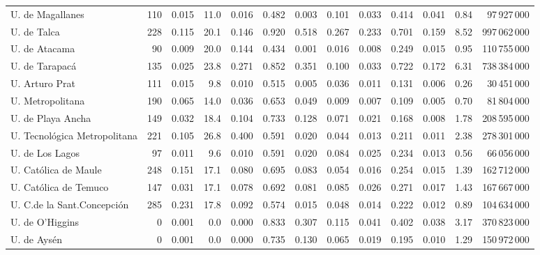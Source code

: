 \documentclass[twocolumn]{article}
\begin{document}
\begin{table}
\begin{tabular}{l rrrrrrrrrr rr}
U. de Magallanes           & 110 & 0.015 & 11.0 & 0.016 & 0.482 & 0.003 & 0.101 & 0.033 & 0.414 & 0.041 &  0.84 &     97\,927\,000\\
U. de Talca	               & 228 & 0.115 & 20.1 & 0.146 & 0.920 & 0.518 & 0.267 & 0.233 & 0.701 & 0.159 &  8.52 &    997\,062\,000\\
U. de Atacama              &  90 & 0.009 & 20.0 & 0.144 & 0.434 & 0.001 & 0.016 & 0.008 & 0.249 & 0.015 &  0.95 &    110\,755\,000\\
U. de Tarapacá             & 135 & 0.025 & 23.8 & 0.271 & 0.852 & 0.351 & 0.100 & 0.033 & 0.722 & 0.172 &  6.31 &    738\,384\,000\\
U. Arturo Prat             & 111 & 0.015 &  9.8 & 0.010 & 0.515 & 0.005 & 0.036 & 0.011 & 0.131 & 0.006 &  0.26 &     30\,451\,000\\
U. Metropolitana           & 190 & 0.065 & 14.0 & 0.036 & 0.653 & 0.049 & 0.009 & 0.007 & 0.109 & 0.005 &  0.70 &     81\,804\,000\\
U. de Playa Ancha          & 149 & 0.032 & 18.4 & 0.104 & 0.733 & 0.128 & 0.071 & 0.021 & 0.168 & 0.008 &  1.78 &    208\,595\,000\\
U. Tecnológica Metropolitana&221 & 0.105 & 26.8 & 0.400 & 0.591 & 0.020 & 0.044 & 0.013 & 0.211 & 0.011 &  2.38 &    278\,301\,000\\
U. de Los Lagos            &  97 & 0.011 &  9.6 & 0.010 & 0.591 & 0.020 & 0.084 & 0.025 & 0.234 & 0.013 &  0.56 &     66\,056\,000\\
U. Católica de Maule       & 248 & 0.151 & 17.1 & 0.080 & 0.695 & 0.083 & 0.054 & 0.016 & 0.254 & 0.015 &  1.39 &    162\,712\,000\\
U. Católica de Temuco      & 147 & 0.031 & 17.1 & 0.078 & 0.692 & 0.081 & 0.085 & 0.026 & 0.271 & 0.017 &  1.43 &    167\,667\,000\\
U. C.de la Sant.Concepción & 285 & 0.231 & 17.8 & 0.092 & 0.574 & 0.015 & 0.048 & 0.014 & 0.222 & 0.012 &  0.89 &    104\,634\,000\\
U. de O'Higgins	           &   0 & 0.001 &  0.0 & 0.000 & 0.833 & 0.307 & 0.115 & 0.041 & 0.402 & 0.038 &  3.17 &    370\,823\,000\\
U. de Aysén                &   0 & 0.001 &  0.0 & 0.000 & 0.735 & 0.130 & 0.065 & 0.019 & 0.195 & 0.010 &  1.29 &    150\,972\,000\\
\hline
\end{tabular}
\end{table}
\end{document}
